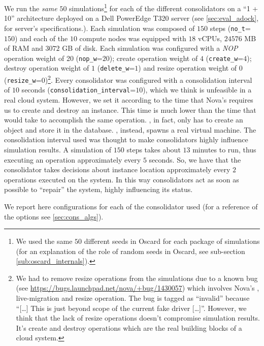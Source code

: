 We run the \emph{same} $50$ simulations\footnote{We used the same $50$ different seeds in Oscard for each package of simulations (for an explanation of the role of random seeds in Oscard, see sub-section \ref{sub:oscard_internals}).} for each of the different consolidators on a ``1 + 10'' architecture deployed on a Dell PowerEdge T320 server (see \ref{sec:eval_adock}, for server's specifications.). Each simulation was composed of $150$ steps (\texttt{no\_t}=$150$) and each of the $10$ compute nodes was equipped with $18$ vCPUs, $24576$ MB of RAM and $3072$ GB of disk.
Each simulation was configured with a \textit{NOP} operation weight of 20 (\texttt{nop\_w}=$20$); create operation weight of $4$ (\texttt{create\_w}=$4$); destroy operation weight of $1$ (\texttt{delete\_w}=$1$) and resize operation weight of $0$ (\texttt{resize\_w}=$0$)\footnote{We had to remove resize operations from the simulations due to a known bug (see \url{https://bugs.launchpad.net/nova/+bug/1430057}) which involves Nova's , live-migration and resize operation. The bug is tagged as ``invalid'' because ``[\ldots] This is just beyond scope of the current fake driver [\ldots]''. However, we think that the lack of resize operations doesn't compromise simulation results. It's create and destroy operations which are the real building blocks of a cloud system.}. Every consolidator was configured with a consolidation interval of $10$ seconds (\texttt{consolidation\_interval}=$10$), which we think is unfeasible in a real cloud system. However, we set it according to the time that Nova's  requires us to create and destroy an instance. This time is much lower than the time that would take  to accomplish the same operation. , in fact, only has to create an object and store it in the database. , instead, spawns a real virtual machine. The consolidation interval used was thought to make consolidators highly influence simulation results. A simulation of $150$ steps takes about $13$ minutes to run, thus executing an operation approximately every $5$ seconds. So, we have that the consolidator takes decisions about instance location approximately every $2$ operations executed on the system. In this way consolidators act as soon as possible to ``repair'' the system, highly influencing its status.

We report here configurations for each of the consolidator used (for a reference of the options see \ref{sec:cons_algs}).

